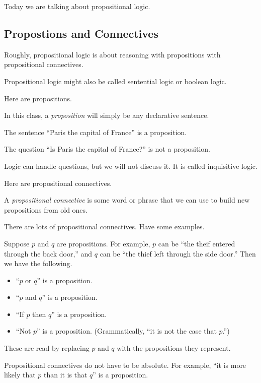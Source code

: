 

Today we are talking about propositional logic.

\subsection{Propostions and Connectives}
Roughly, propositional logic is about reasoning with propositions with propositional connectives.
\begin{remark}
	Propositional logic might also be called sentential logic or boolean logic.
\end{remark}
Here are propositions.
\begin{definition}[Proposition]
	In this class, a \textit{proposition} will simply be any declarative sentence.
\end{definition}
\begin{example}
	The sentence ``Paris the capital of France'' is a proposition.
\end{example}
\begin{nex}
	The question ``Is Paris the capital of France?'' is not a proposition.
\end{nex}
\begin{remark}
	Logic can handle questions, but we will not discuss it. It is called inquisitive logic.
\end{remark}
Here are propositional connectives.
\begin{definition}[Connective]
	A \textit{propositional connective} is some word or phrase that we can use to build new propositions from old ones.
\end{definition}
There are lots of propositional connectives. Have some examples.
\begin{example}
	Suppose $p$ and $q$ are propositions. For example, $p$ can be ``the theif entered through the back door,'' and $q$ can be ``the thief left through the side door.'' Then we have the following.
	\begin{itemize}
		\item ``$p$ or $q$'' is a proposition.
		\item ``$p$ and $q$'' is a proposition.
		\item ``If $p$ then $q$'' is a proposition.
		\item ``Not $p$'' is a proposition. (Grammatically, ``it is not the case that $p$.'')
	\end{itemize}
	These are read by replacing $p$ and $q$ with the propositions they represent.
\end{example}
\begin{example}
	Propositional connectives do not have to be absolute. For example, ``it is more likely that $p$ than it is that $q$'' is a proposition.
\end{example}

